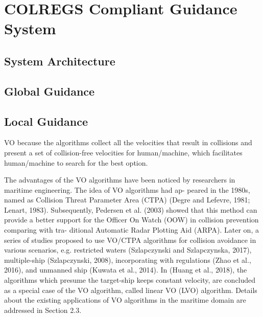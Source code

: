 \chapter{COLREGS Compliant Guidance System}
\label{chap:4_COLREGS_Compliant_Guidance_System}

\section{System Architecture}
\section{Global Guidance}
\section{Local Guidance}
VO because the algorithms collect all the velocities that result in collisions and present a set of collision-free velocities for human/machine, which facilitates human/machine to search for the best option.

The advantages of the VO algorithms have been noticed by researchers in maritime engineering. The idea of VO algorithms had ap- peared in the 1980s, named as Collision Threat Parameter Area (CTPA) (Degre and Lefevre, 1981; Lenart, 1983). Subsequently, Pedersen et al. (2003) showed that this method can provide a better support for the Officer On Watch (OOW) in collision prevention comparing with tra- ditional Automatic Radar Plotting Aid (ARPA). Later on, a series of studies proposed to use VO/CTPA algorithms for collision avoidance in various scenarios, e.g. restricted waters (Szlapczynski and Szlapczynska, 2017), multiple-ship (Szlapczynski, 2008), incorporating with regulations (Zhao et al., 2016), and unmanned ship (Kuwata et al., 2014). In (Huang et al., 2018), the algorithms which presume the target-ship keeps constant velocity, are concluded as a special case of the VO algorithm, called linear VO (LVO) algorithm. Details about the existing applications of VO algorithms in the maritime domain are addressed in Section 2.3.
